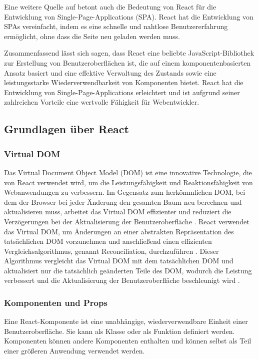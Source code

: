 Eine weitere Quelle auf \cite{makeuseof} betont auch die Bedeutung von React für die Entwicklung von Single-Page-Applications (SPA). React hat die Entwicklung von SPAs vereinfacht, indem es eine schnelle und nahtlose Benutzererfahrung ermöglicht, ohne dass die Seite neu geladen werden muss.

Zusammenfassend lässt sich sagen, dass React eine beliebte JavaScript-Bibliothek zur Erstellung von Benutzeroberflächen ist, die auf einem komponentenbasierten Ansatz basiert und eine effektive Verwaltung des Zustands sowie eine leistungsstarke Wiederverwendbarkeit von Komponenten bietet. React hat die Entwicklung von Single-Page-Applications erleichtert und ist aufgrund seiner zahlreichen Vorteile eine wertvolle Fähigkeit für Webentwickler.

\subsection{Grundlagen über React}
\subsubsection{Virtual DOM}
Das Virtual Document Object Model (DOM) ist eine innovative Technologie, die von React verwendet wird, um die Leistungsfähigkeit und Reaktionsfähigkeit von Webanwendungen zu verbessern. Im Gegensatz zum herkömmlichen DOM, bei dem der Browser bei jeder Änderung den gesamten Baum neu berechnen und aktualisieren muss, arbeitet das Virtual DOM effizienter und reduziert die Verzögerungen bei der Aktualisierung der Benutzeroberfläche \cite{goswami2020}.
React verwendet das Virtual DOM, um Änderungen an einer abstrakten Repräsentation des tatsächlichen DOM vorzunehmen und anschließend einen effizienten Vergleichsalgorithmus, genannt Reconciliation, durchzuführen \cite{reactinternals}. Dieser Algorithmus vergleicht das Virtual DOM mit dem tatsächlichen DOM und aktualisiert nur die tatsächlich geänderten Teile des DOM, wodurch die Leistung verbessert und die Aktualisierung der Benutzeroberfläche beschleunigt wird \cite{banks2016}.

\subsubsection{Komponenten und Props}
Eine React-Komponente ist eine unabhängige, wiederverwendbare Einheit einer Benutzeroberfläche. Sie kann als Klasse oder als Funktion definiert werden. Komponenten können andere Komponenten enthalten und können selbst als Teil einer größeren Anwendung verwendet werden.

